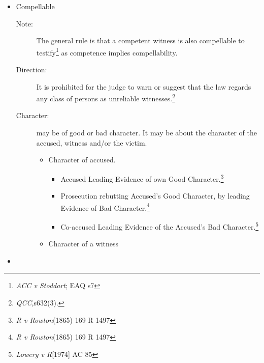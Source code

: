 \begin{itemize}
    \item Compellable
        \begin{description}
            \item[Note:]The general rule is that a competent witness is also compellable to testify\footnote{\textit{ACC v Stoddart}; EAQ s7} as competence implies compellability.
            \item[Direction:]It is prohibited for the judge to warn or suggest that the law regards any class of persons as unreliable witnesses.\footnote{\textit{QCC},s632(3).}
            \item[Character:] may be of good or bad character. It may be about the character of the accused, witness and/or the victim.
                \begin{itemize}
                    \item Character of accused.
                        \begin{itemize}
                            \item Accused Leading Evidence of own Good Character.\footnote{\textit{R v Rowton}(1865) 169 R 1497}
                            \item Prosecution rebutting Accused’s Good Character, by leading Evidence of Bad Character.\footnote{\textit{R v Rowton}(1865) 169 R 1497}
                            \item Co-accused Leading Evidence of the Accused’s Bad Character.\footnote{\textit{Lowery v R}[1974] AC 85}
                        \end{itemize}
                    \item Character of a witness
                \end{itemize}
        \end{description}

    \item 
\end{itemize}